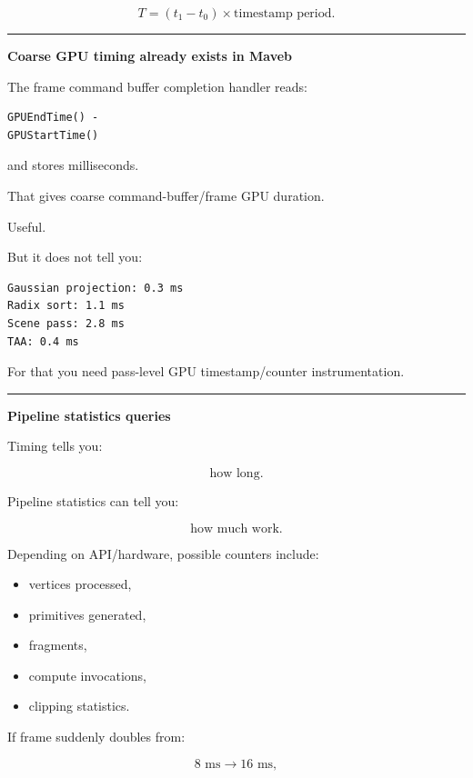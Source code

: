 \[
\boxed{
T=
(t_1-t_0)\times
\text{timestamp period}.
}
\]

\begin{center}\rule{0.5\linewidth}{0.5pt}\end{center}

\textbf{Coarse GPU timing already exists in Maveb}

The frame command buffer completion handler reads:

\protect{}\label{p10-gpu-time}%
\begin{verbatim}
GPUEndTime() -
GPUStartTime()
\end{verbatim}

and stores milliseconds.

That gives coarse command-buffer/frame GPU duration.

Useful.

But it does not tell you:

\protect{}\label{p10-pass-timing-needed}%
\begin{verbatim}
Gaussian projection: 0.3 ms
Radix sort: 1.1 ms
Scene pass: 2.8 ms
TAA: 0.4 ms
\end{verbatim}

For that you need pass-level GPU timestamp/counter instrumentation.

\begin{center}\rule{0.5\linewidth}{0.5pt}\end{center}

\textbf{Pipeline statistics queries}

Timing tells you:

\[
\text{how long}.
\]

Pipeline statistics can tell you:

\[
\text{how much work}.
\]

Depending on API/hardware, possible counters include:

\begin{itemize}
\tightlist
\item
  vertices processed,
\item
  primitives generated,
\item
  fragments,
\item
  compute invocations,
\item
  clipping statistics.
\end{itemize}

If frame suddenly doubles from:

\[
8\text{ ms}\rightarrow16\text{ ms},
\]

